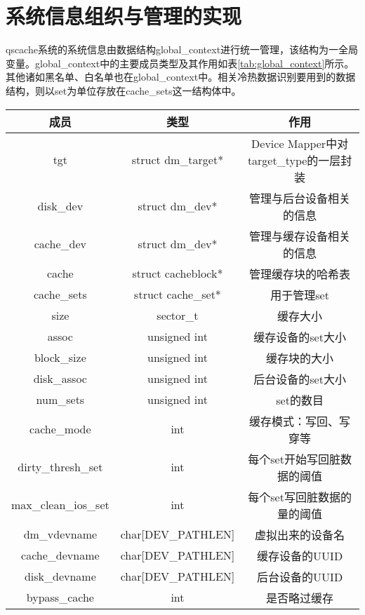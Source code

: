 \section{系统信息组织与管理的实现}

qscache系统的系统信息由数据结构global\_context进行统一管理，该结构为一全局变量。global\_context中的主要成员类型及其作用如表\ref{tab:global_context}所示。其他诸如黑名单、白名单也在global\_context中。相关冷热数据识别要用到的数据结构，则以set为单位存放在cache\_sets这一结构体中。

\begin{table}[!htbp]
    \centering
    \begin{tabular}{ccc} 
        \toprule
        成员 & 类型 & 作用\\
        \midrule
        tgt & struct dm\_target* & Device Mapper中对target\_type的一层封装 \\ 
        disk\_dev & struct dm\_dev* & 管理与后台设备相关的信息 \\ 
        cache\_dev & struct dm\_dev* & 管理与缓存设备相关的信息 \\ 
        cache & struct cacheblock* & 管理缓存块的哈希表 \\ 
        cache\_sets & struct cache\_set* & 用于管理set \\ 
        size & sector\_t & 缓存大小 \\ 
        assoc & unsigned int & 缓存设备的set大小 \\ 
        block\_size & unsigned int & 缓存块的大小 \\ 
        disk\_assoc & unsigned int & 后台设备的set大小 \\ 
        num\_sets & unsigned int & set的数目 \\ 
        cache\_mode & int & 缓存模式：写回、写穿等 \\ 
        dirty\_thresh\_set & int & 每个set开始写回脏数据的阈值 \\ 
        max\_clean\_ios\_set & int & 每个set写回脏数据的量的阈值 \\ 
        dm\_vdevname & char[DEV\_PATHLEN] & 虚拟出来的设备名 \\ 
        cache\_devname & char[DEV\_PATHLEN] & 缓存设备的UUID \\ 
        disk\_devname & char[DEV\_PATHLEN] & 后台设备的UUID \\ 
        bypass\_cache & int & 是否略过缓存 \\      
        \bottomrule
    \end{tabular}
\end{table}

